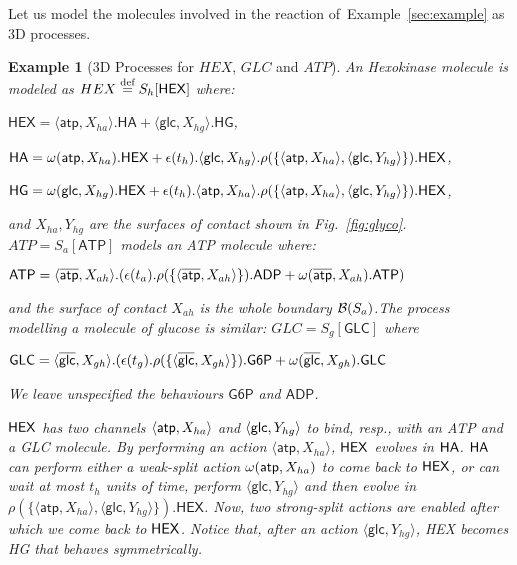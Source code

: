 \documentclass[11pt]{article}
\newtheorem{example}{Example}
\newcommand{\eqdef}{\stackrel{\mbox{\scriptsize \rm def}}{=}}
\newcommand{\boundary}[1]{\ensuremath{{\cal B}(#1)}}
\begin{document}
Let us model the molecules involved in the reaction of~Example~\ref{sec:example} as 3D
processes.

\begin{example}[3D Processes for $HEX$, $GLC$ and $ATP$]\label{ex:running}
An Hexokinase molecule is modeled as $HEX \eqdef S_h[\mathsf{HEX}]$ where:

\smallskip

\noindent $\mathsf{HEX} = \langle \mathsf{atp}, X_{ha} \rangle.\mathsf{HA} + \langle
\mathsf{glc}, X_{hg} \rangle.\mathsf{HG}$,

\noindent $\mathsf{HA} =  \omega({\sf atp}, X_{ha}) . {\sf HEX} + \epsilon(t_h). \langle {\sf glc},
X_{hg} \rangle. \rho(\{ \langle {\sf atp}, X_{ha} \rangle, \langle {\sf glc}, Y_{hg} \rangle \}).
{\sf HEX} $,

\noindent $\mathsf{HG} = \omega({\sf glc}, X_{hg}) . {\sf HEX} + \epsilon(t_h).\langle {\sf atp},
X_{ha} \rangle . \rho(\{ \langle {\sf atp}, X_{ha} \rangle, \langle {\sf glc}, Y_{hg} \rangle \}).
{\sf HEX}$,

\smallskip

\noindent and $X_{ha}, Y_{hg}$ are the surfaces of contact shown in Fig.~\ref{fig:glyco}. $ATP =
S_a[\mathsf{ATP}]$ models an ATP molecule where:

\smallskip

${\sf ATP}
= \langle \overline{{\sf atp}}, X_{ah} \rangle . ( \epsilon(t_a) . \rho(\{\langle \overline{{\sf
atp}}, X_{ah} \rangle\}) . {\sf ADP} + \omega(\overline{{\sf atp}}, X_{ah}) . {\sf ATP})$

\smallskip

\noindent and the surface of contact $X_{ah}$ is the whole boundary $\boundary{S_a}$.The process
modelling a molecule of glucose is similar: $GLC = S_g[\mathsf{GLC}]$ where

\smallskip

$\mathsf{GLC} = \langle
\overline{\mathsf{glc}}, X_{gh} \rangle . ( \epsilon(t_g) . \rho(\{\langle \overline{{\sf glc}},
X_{gh} \rangle\}) . \mathsf{G6P} + \omega(\overline{\mathsf{glc}}, X_{gh}) . \mathsf{GLC}$

\smallskip

\noindent We leave unspecified the behaviours $\mathsf{G6P}$ and $\mathsf{ADP}$.

${\sf HEX}$ has two channels $\langle {\sf atp}, X_{ha} \rangle$ and
$\langle {\sf glc}, Y_{hg}\rangle$ to bind, resp., with an ATP and a GLC molecule.
By performing an action $\langle \mathsf{atp}, X_{ha} \rangle$, ${\sf HEX}$ evolves in ${\sf HA}$.
${\sf HA}$ can perform either a weak-split action $\omega({\sf atp}, X_{ha})$ to come back to
${\sf HEX}$, or can wait at most $t_h$ units of time, perform $\langle \mathsf{glc}, Y_{hg}
\rangle$ and then evolve in $\rho(\{ \langle \mathsf{atp}, X_{ha} \rangle, \langle \mathsf{glc},
Y_{hg} \rangle \}). \mathsf{HEX}$. Now, two strong-split actions are enabled after which we come
back to ${\sf HEX}$. Notice that, after an action $\langle \mathsf{glc}, Y_{hg} \rangle$, {\sf HEX} becomes {\sf HG} that behaves symmetrically.


\end{example}
\end{document}
